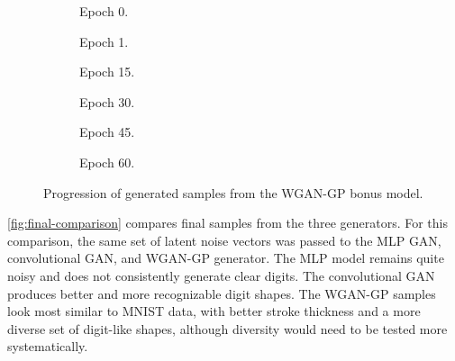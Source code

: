 \begin{figure}[p]
    \centering
    \begin{subfigure}{0.32\textwidth}
        \centering
        \caption{Epoch 0.}
    \end{subfigure}
    \hfill
    \begin{subfigure}{0.32\textwidth}
        \centering
        \caption{Epoch 1.}
    \end{subfigure}
    \hfill
    \begin{subfigure}{0.32\textwidth}
        \centering
        \caption{Epoch 15.}
    \end{subfigure}

    \vspace{0.2em}

    \begin{subfigure}{0.32\textwidth}
        \centering
        \caption{Epoch 30.}
    \end{subfigure}
    \hfill
    \begin{subfigure}{0.32\textwidth}
        \centering
        \caption{Epoch 45.}
    \end{subfigure}
    \hfill
    \begin{subfigure}{0.32\textwidth}
        \centering
        \caption{Epoch 60.}
    \end{subfigure}
    \caption{Progression of generated samples from the WGAN-GP bonus model.}
    \label{fig:wgan-progression}
\end{figure}
\FloatBarrier

\autoref{fig:final-comparison} compares final samples from the three generators.
For this comparison, the same set of latent noise vectors was passed to the MLP GAN, convolutional GAN, and WGAN-GP generator.
The MLP model remains quite noisy and does not consistently generate clear digits. The convolutional GAN produces better and more recognizable digit shapes.
The WGAN-GP samples look most similar to MNIST data, with better stroke thickness and a more diverse set of digit-like shapes, although diversity would need to be tested more systematically.

